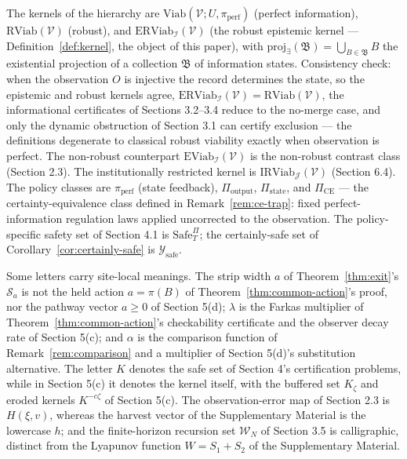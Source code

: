 \documentclass[10pt,twocolumn]{article}
\theoremstyle{definition}
\begin{document}
The kernels of the hierarchy are
\(\mathrm{Viab}(\mathcal{V}; U, \pi_{\mathrm{perf}})\) (perfect
information), \(\mathrm{RViab}(\mathcal{V})\) (robust), and
\(\mathrm{ERViab}_{\mathcal{I}}(\mathcal{V})\) (the robust epistemic
kernel --- Definition~\ref{def:kernel}, the object of this paper), with
\(\mathrm{proj}_{\exists}(\mathfrak{B}) = \bigcup_{B \in \mathfrak{B}} B\)
the existential projection of a collection \(\mathfrak{B}\) of information states. Consistency check: when the observation \(O\) is injective the record determines the state, so the epistemic and robust kernels agree, \(\mathrm{ERViab}_{\mathcal{I}}(\mathcal{V}) = \mathrm{RViab}(\mathcal{V})\), the informational certificates of Sections 3.2--3.4 reduce to the no-merge case, and only the dynamic obstruction of Section 3.1 can certify exclusion --- the definitions degenerate to classical robust viability exactly when observation is perfect. The non-robust counterpart
\(\mathrm{EViab}_{\mathcal{I}}(\mathcal{V})\) is the non-robust contrast class (Section 2.3). The institutionally restricted kernel is \(\mathrm{IRViab}_{\mathcal{J}}(\mathcal{V})\) (Section 6.4). The policy classes
are \(\pi_{\mathrm{perf}}\) (state feedback), \(\Pi_{\mathrm{output}}\),
\(\Pi_{\mathrm{state}}\), and \(\Pi_{\mathrm{CE}}\) --- the
certainty-equivalence class defined in Remark~\ref{rem:ce-trap}: fixed
perfect-information regulation laws applied uncorrected to the
observation. The policy-specific safety set of Section 4.1 is
\(\mathrm{Safe}^{\Pi}_T\); the certainly-safe set of Corollary~\ref{cor:certainly-safe} is
\(\mathcal{Y}_{\mathrm{safe}}\).

Some letters carry site-local meanings. The strip width \(a\) of
Theorem~\ref{thm:exit}'s \(\mathcal{S}_a\) is not the held action
\(a = \pi(B)\) of Theorem~\ref{thm:common-action}'s proof, nor the
pathway vector \(a \ge 0\) of Section 5(d); \(\lambda\) is the Farkas
multiplier of Theorem~\ref{thm:common-action}'s checkability
certificate and the observer decay rate of Section 5(c); and
\(\alpha\) is the comparison function of Remark~\ref{rem:comparison}
and a multiplier of Section 5(d)'s substitution alternative. The
letter \(K\) denotes the safe set of Section 4's certification
problems, while in Section 5(c) it denotes the kernel
itself, with the buffered set \(K_\zeta\) and eroded kernels
\(K^{-c\zeta}\) of Section 5(c). The observation-error map of
Section 2.3 is \(H(\xi, v)\), whereas the harvest vector of
the Supplementary Material is the lowercase \(h\); and the finite-horizon recursion
set \(\mathcal{W}_N\) of Section 3.5 is calligraphic, distinct from
the Lyapunov function \(W = S_1 + S_2\) of the Supplementary Material.
\end{document}
